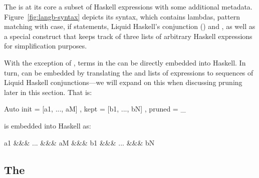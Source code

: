 The \LangB is at its core a subset of Haskell expressions with some
additional metadata.  Figure~\ref{fig:langb-syntax} depicts its
syntax, which contains lambdas, pattern matching with case, if
statements, Liquid Haskell's conjunction (\LC{&&&}) and , as
well as a special construct  that keeps track of three lists of
arbitrary Haskell expressions for simplification purposes.

With the exception of , terms in the \LangB can be directly
embedded into Haskell. In turn,  can be embedded by
translating the  and  lists of expressions to
sequences of Liquid Haskell conjunctions---we will expand on this when
discussing pruning later in this section. That is:
\begin{code}
  Auto { init = [a1, ..., aM]
       , kept = [b1, ..., bN]
       , pruned = _ }
\end{code}
is embedded into Haskell as:
\begin{code}
  a1 &&& ... &&& aM &&& b1 &&& ... &&& bN
\end{code}


% 
%  
\subsection{The \LangA}
\label{sec:proof-macro-lang}

